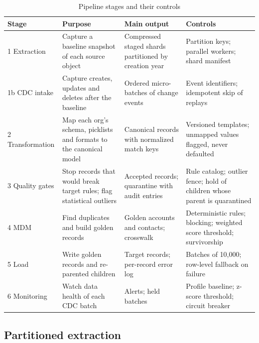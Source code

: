 \begin{table}[htbp]
\centering
\caption{Pipeline stages and their controls}
\label{tab:1}
\setlength{\tabcolsep}{4pt}
\renewcommand{\arraystretch}{1.15}
\footnotesize
\begin{tabular}{>{\raggedright\arraybackslash\hspace{0pt}}p{}>{\raggedright\arraybackslash\hspace{0pt}}p{}>{\raggedright\arraybackslash\hspace{0pt}}p{}>{\raggedright\arraybackslash\hspace{0pt}}p{}}
\hline
\textbf{Stage} & \textbf{Purpose} & \textbf{Main output} & \textbf{Controls} \\
\hline
1 Extraction & Capture a baseline snapshot of each source object & Compressed staged shards partitioned by creation year & Partition keys; parallel workers; shard manifest \\
1b CDC intake & Capture creates, updates and deletes after the baseline & Ordered micro-batches of change events & Event identifiers; idempotent skip of replays \\
2 Transformation & Map each org's schema, picklists and formats to the canonical model & Canonical records with normalized match keys & Versioned templates; unmapped values flagged, never defaulted \\
3 Quality gates & Stop records that would break target rules; flag statistical outliers & Accepted records; quarantine with audit entries & Rule catalog; outlier fence; hold of children whose parent is quarantined \\
4 MDM & Find duplicates and build golden records & Golden accounts and contacts; crosswalk & Deterministic rules; blocking; weighted score threshold; survivorship \\
5 Load & Write golden records and re-parented children & Target records; per-record error log & Batches of 10,000; row-level fallback on failure \\
6 Monitoring & Watch data health of each CDC batch & Alerts; held batches & Profile baseline; z-score threshold; circuit breaker \\
\hline
\end{tabular}
\end{table}


\subsection{Partitioned extraction}\label{sec:3.2}

